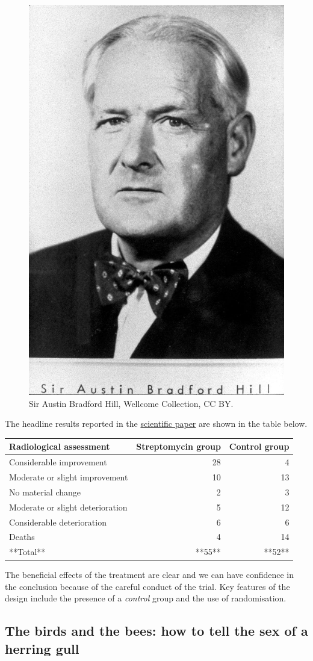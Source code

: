 \documentclass[
]{book}
\begin{document}
\begin{figure}

{\centering \includegraphics[width=0.2\linewidth]{images/bradford-hill} 

}

\caption{Sir Austin Bradford Hill,  Wellcome Collection, CC BY.}\label{fig:bradford-hill-image}
\end{figure}

The headline results reported in the \href{https://www.ncbi.nlm.nih.gov/pmc/articles/PMC2091872/pdf/brmedj03701-0007.pdf}{scientific paper} are shown in the table below.

\begin{tabular}{l|r|r}
\hline
Radiological assessment & Streptomycin group & Control group\\
\hline
Considerable improvement & 28 & 4\\
\hline
Moderate or slight improvement & 10 & 13\\
\hline
No material change & 2 & 3\\
\hline
Moderate or slight deterioration & 5 & 12\\
\hline
Considerable deterioration & 6 & 6\\
\hline
Deaths & 4 & 14\\
\hline
**Total** & **55** & **52**\\
\hline
\end{tabular}

The beneficial effects of the treatment are clear and we can have confidence in the conclusion because of the careful conduct of the trial. Key features of the design include the presence of a \emph{control} group and the use of randomisation.

\subsection{The birds and the bees: how to tell the sex of a herring gull}\label{the-birds-and-the-bees-how-to-tell-the-sex-of-a-herring-gull}
\end{document}

